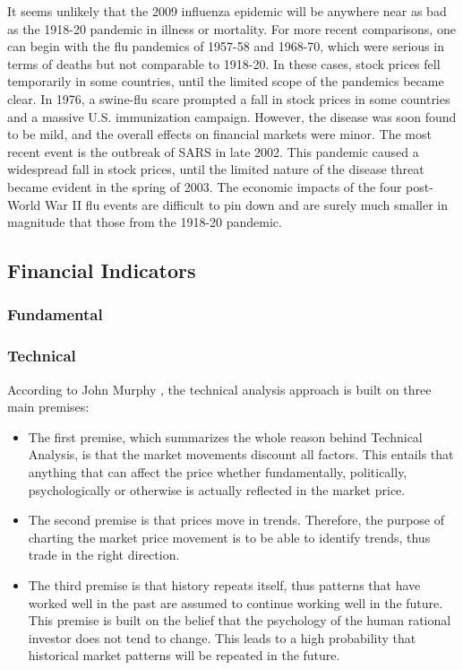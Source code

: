 \documentclass[]{book}
\providecommand{\tightlist}{%
  \setlength{\itemsep}{0pt}\setlength{\parskip}{0pt}}
\begin{document}
It seems unlikely that the 2009 influenza epidemic will be anywhere near as bad as the 1918-20 pandemic in illness or mortality. For more recent comparisons, one can begin with the flu pandemics of 1957-58 and 1968-70, which were serious in terms of deaths but not comparable to 1918-20. In these cases, stock prices fell temporarily in some countries, until the limited scope of the pandemics became clear. In 1976, a swine-flu scare prompted a fall in stock prices in some countries and a massive U.S. immunization campaign. However, the disease was soon found to be mild, and the overall effects on financial markets were minor. The most recent event is the outbreak of SARS in late 2002. This pandemic caused a widespread fall in stock prices, until the limited nature of the disease threat became evident in the spring of 2003. The economic impacts of the four post-World War II flu events are difficult to pin down and are surely much smaller in magnitude that those from the 1918-20 pandemic.

\hypertarget{financial-indicators}{%
\subsection{Financial Indicators}\label{financial-indicators}}

\hypertarget{fundamental}{%
\subsubsection{Fundamental}\label{fundamental}}

\hypertarget{technical}{%
\subsubsection{Technical}\label{technical}}

According to John Murphy \citeyearpar{murphy1999technical}, the technical analysis approach is built on three main premises:

\begin{itemize}
\tightlist
\item
  The first premise, which summarizes the whole reason behind Technical Analysis, is that the market movements discount all factors. This entails that anything that can affect the price whether fundamentally, politically, psychologically or otherwise is actually reflected in the market price.
\item
  The second premise is that prices move in trends. Therefore, the purpose of charting the market price movement is to be able to identify trends, thus trade in the right direction.
\item
  The third premise is that history repeats itself, thus patterns that have worked well in the past are assumed to continue working well in the future. This premise is built on the belief that the psychology of the human rational investor does not tend to change. This leads to a high probability that historical market patterns will be repeated in the future.
\end{itemize}
\end{document}
